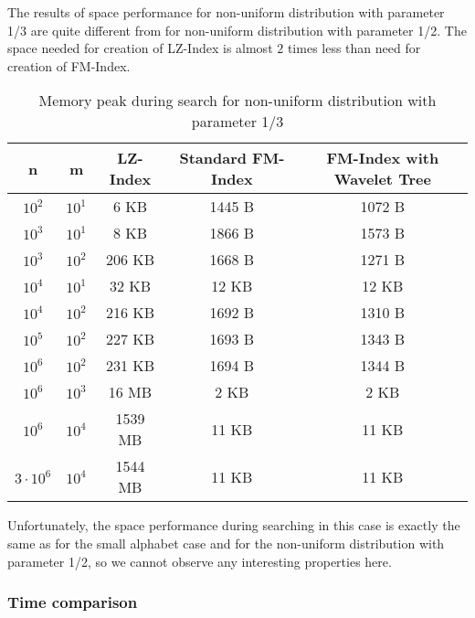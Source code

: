 The results of space performance for non-uniform distribution with parameter 1/3 are quite different from for non-uniform distribution with parameter 1/2. The space needed for creation of LZ-Index is almost $2$ times less than need for creation of FM-Index.

\begin{table}[H]
\begin{center}
\caption{Memory peak during search for non-uniform distribution with parameter 1/3}
\begin{tabular}{|c|c|c|c|c|}
\hline
\rowcolor[HTML]{C0C0C0}
n & m & LZ-Index & Standard FM-Index & FM-Index with Wavelet Tree \\ \hline
$10^{2}$ & $10^{1}$ & 6 KB & 1445 B & 1072 B \\ \hline
$10^{3}$ & $10^{1}$ & 8 KB & 1866 B & 1573 B \\ \hline
$10^{3}$ & $10^{2}$ & 206 KB & 1668 B & 1271 B \\ \hline
$10^{4}$ & $10^{1}$ & 32 KB & 12 KB & 12 KB \\ \hline
$10^{4}$ & $10^{2}$ & 216 KB & 1692 B & 1310 B \\ \hline
$10^{5}$ & $10^{2}$ & 227 KB & 1693 B & 1343 B \\ \hline
$10^{6}$ & $10^{2}$ & 231 KB & 1694 B & 1344 B \\ \hline
$10^{6}$ & $10^{3}$ & 16 MB & 2 KB & 2 KB \\ \hline
$10^{6}$ & $10^{4}$ & 1539 MB & 11 KB & 11 KB \\ \hline
$3 \cdot 10^{6}$ & $10^{4}$ & 1544 MB & 11 KB & 11 KB \\ \hline
\end{tabular}
\end{center}
\end{table}

Unfortunately, the space performance during searching in this case is exactly the same as for the small alphabet case and for the non-uniform distribution with parameter 1/2, so we cannot observe any interesting properties here.

\subsubsection{Time comparison}

